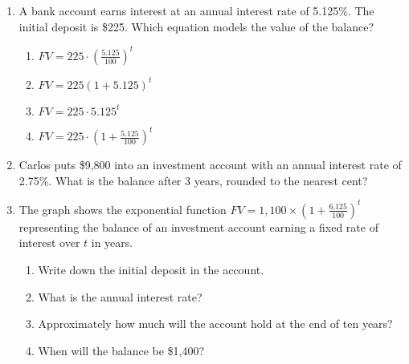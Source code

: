 \documentclass[12pt, twoside]{article}
\begin{document}
\begin{enumerate}
\item A bank account earns interest at an annual interest rate of 5.125\%. The initial deposit is \$225. Which equation models the value of the balance?
\begin{multicols}{2}
    \begin{enumerate}[itemsep=0.5cm]
        \item $\displaystyle FV=225 \cdot \left( \frac{5.125}{100}\right)^{t}$
        \item $FV=225 (1+5.125)^{t}$
        \item $FV=225 \cdot 5.125^{t}$
        \item $\displaystyle FV=225 \cdot \left(1+ \frac{5.125}{100}\right)^{t}$
    \end{enumerate}
\end{multicols}

\item Carlos puts \$9,800 into an investment account with an annual interest rate of 2.75\%. What is the balance after 3 years, rounded to the nearest cent? \vspace{2cm}

\item The graph shows the exponential function $\displaystyle FV=1,100 \times \left( 1+\frac{6.125}{100} \right)^t$ representing the balance of an investment account earning a fixed rate of interest over $t$ in years.
\begin{multicols}{2}
    \begin{enumerate}[itemsep=1cm]
        \item Write down the initial deposit in the account.
        \item What is the annual interest rate?
        \item Approximately how much will the account hold at the end of ten years?
        \item When will the balance be \$1,400?
    \end{enumerate}
    \begin{center}
\end{center}
\end{multicols}
\end{enumerate}
\end{document}
